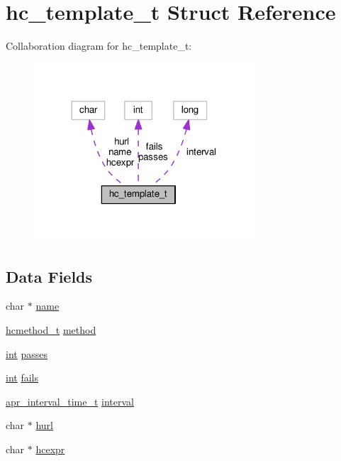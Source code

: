 \hypertarget{structhc__template__t}{}\section{hc\+\_\+template\+\_\+t Struct Reference}
\label{structhc__template__t}


Collaboration diagram for hc\+\_\+template\+\_\+t\+:
\nopagebreak
\begin{figure}[H]
\begin{center}
\leavevmode
\includegraphics[width=234pt]{structhc__template__t__coll__graph}
\end{center}
\end{figure}
\subsection*{Data Fields}
\begin{DoxyCompactItemize}
\item 
char $\ast$ \hyperlink{structhc__template__t_a7691abe48318552a90bc6af19561eaef}{name}
\item 
\hyperlink{group__MOD__PROXY_ga4e8622ade6bde29385df7b89c9b94e71}{hcmethod\+\_\+t} \hyperlink{structhc__template__t_a61da58b226d3dc1eba00e7710d86bb5a}{method}
\item 
\hyperlink{pcre_8txt_a42dfa4ff673c82d8efe7144098fbc198}{int} \hyperlink{structhc__template__t_a0f78c5312c98825ca2cc335b7e2ecba0}{passes}
\item 
\hyperlink{pcre_8txt_a42dfa4ff673c82d8efe7144098fbc198}{int} \hyperlink{structhc__template__t_ab3880f749d7bbce3895ac3b6bf994e6c}{fails}
\item 
\hyperlink{group__apr__time_gaae2129185a395cc393f76fabf4f43e47}{apr\+\_\+interval\+\_\+time\+\_\+t} \hyperlink{structhc__template__t_a68f84dd0917865440349a594111b8bd7}{interval}
\item 
char $\ast$ \hyperlink{structhc__template__t_a57d6b9deb21b28b7086c08b0e1c4257f}{hurl}
\item 
char $\ast$ \hyperlink{structhc__template__t_aafeccf951c49f0ea8a7612e627271909}{hcexpr}
\end{DoxyCompactItemize}


